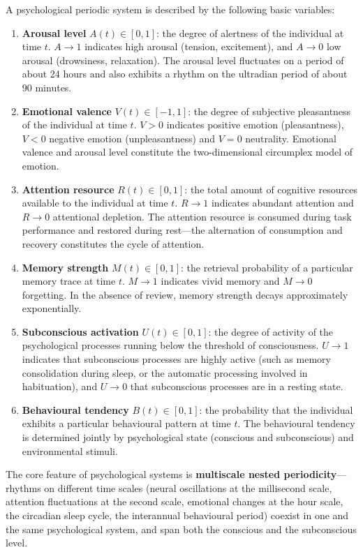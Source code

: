 \begin{definition}\label{def:psychological_quantities}
A psychological periodic system is described by the following basic variables:
\begin{enumerate}[label=(\roman*)]
    \item \textbf{Arousal level} $A(t) \in [0,1]$: the degree of alertness of the individual at time $t$. $A \to 1$ indicates high arousal (tension, excitement), and $A \to 0$ low arousal (drowsiness, relaxation). The arousal level fluctuates on a period of about 24 hours and also exhibits a rhythm on the ultradian period of about 90 minutes.
    \item \textbf{Emotional valence} $V(t) \in [-1,1]$: the degree of subjective pleasantness of the individual at time $t$. $V > 0$ indicates positive emotion (pleasantness), $V < 0$ negative emotion (unpleasantness) and $V = 0$ neutrality. Emotional valence and arousal level constitute the two-dimensional circumplex model of emotion.
    \item \textbf{Attention resource} $R(t) \in [0,1]$: the total amount of cognitive resources available to the individual at time $t$. $R \to 1$ indicates abundant attention and $R \to 0$ attentional depletion. The attention resource is consumed during task performance and restored during rest---the alternation of consumption and recovery constitutes the cycle of attention.
    \item \textbf{Memory strength} $M(t) \in [0,1]$: the retrieval probability of a particular memory trace at time $t$. $M \to 1$ indicates vivid memory and $M \to 0$ forgetting. In the absence of review, memory strength decays approximately exponentially.
    \item \textbf{Subconscious activation} $U(t) \in [0,1]$: the degree of activity of the psychological processes running below the threshold of consciousness. $U \to 1$ indicates that subconscious processes are highly active (such as memory consolidation during sleep, or the automatic processing involved in habituation), and $U \to 0$ that subconscious processes are in a resting state.
    \item \textbf{Behavioural tendency} $B(t) \in [0,1]$: the probability that the individual exhibits a particular behavioural pattern at time $t$. The behavioural tendency is determined jointly by psychological state (conscious and subconscious) and environmental stimuli.
\end{enumerate}
The core feature of psychological systems is \textbf{multiscale nested periodicity}---rhythms on different time scales (neural oscillations at the millisecond scale, attention fluctuations at the second scale, emotional changes at the hour scale, the circadian sleep cycle, the interannual behavioural period) coexist in one and the same psychological system, and span both the conscious and the subconscious level.
\end{definition}

